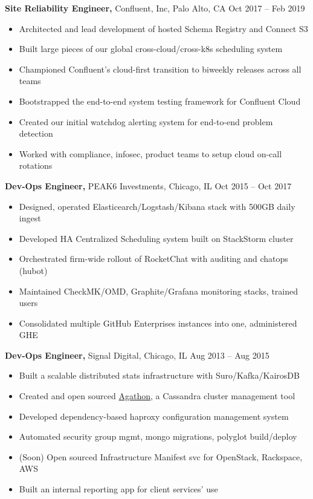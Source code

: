 \documentclass[margin]{res}
\begin{document}
\begin{resume}
{\bf Site Reliability Engineer,} Confluent, Inc, Palo Alto, CA \hfill Oct 2017 -- Feb 2019
\begin{itemize} \itemsep -2pt  %
  \item Architected and lead development of hosted Schema Registry and Connect S3
  \item Built large pieces of our global cross-cloud/cross-k8s scheduling system
  \item Championed Confluent's cloud-first transition to biweekly releases across all teams
  \item Bootstrapped the end-to-end system testing framework for Confluent Cloud
  \item Created our initial watchdog alerting system for end-to-end problem detection
  \item Worked with compliance, infosec, product teams to setup cloud on-call rotations
 \end{itemize}


{\bf Dev-Ops Engineer,} PEAK6 Investments, Chicago, IL \hfill Oct 2015 -- Oct 2017
\begin{itemize} \itemsep -2pt  %
  \item Designed, operated Elasticearch/Logstash/Kibana stack with 500GB daily ingest
  \item Developed HA Centralized Scheduling system built on StackStorm cluster
  \item Orchestrated firm-wide rollout of RocketChat with auditing and chatops (hubot)
  \item Maintained CheckMK/OMD, Graphite/Grafana monitoring stacks, trained users
  \item Consolidated multiple GitHub Enterprises instances into one, administered GHE
 \end{itemize}

{\bf Dev-Ops Engineer,} Signal Digital, Chicago, IL \hfill Aug 2013 -- Aug 2015
\begin{itemize} \itemsep -2pt  %
  \item Built a scalable distributed stats infrastructure with Suro/Kafka/KairosDB
  \item Created and open sourced \href{https://github.com/brighttag/agathon}{Agathon}, a Cassandra cluster management tool
  \item Developed dependency-based haproxy configuration management system
  \item Automated security group mgmt, mongo migrations, polyglot build/deploy
  \item (Soon) Open sourced Infrastructure Manifest svc for OpenStack, Rackspace, AWS
  \item Built an internal reporting app for client services' use
 \end{itemize}


\end{resume}
\end{document}
